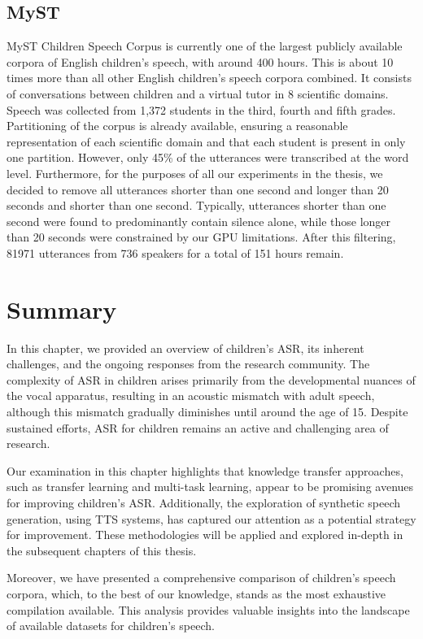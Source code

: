 \subsection{MyST}
\ac{MyST} Children Speech Corpus \cite{MyST} is currently one of the largest publicly available corpora of English children's speech, with around 400 hours. This is about 10 times more than all other English children's speech corpora combined. It consists of conversations between children and a virtual tutor in 8 scientific domains. Speech was collected from 1,372  students in the third, fourth and fifth grades. Partitioning of the corpus is already available, ensuring a reasonable representation of each scientific domain and that each student is present in only one partition. However, only 45\% of the utterances were transcribed at the word level. Furthermore, for the purposes of all our experiments in the thesis, we decided to remove all utterances shorter than one second and longer than 20 seconds and shorter than one second. Typically, utterances shorter than one second were found to predominantly contain silence alone, while those longer than 20 seconds were constrained by our GPU limitations. After this filtering, 81971 utterances from 736 speakers for a total of 151 hours remain.


\section{Summary}
In this chapter, we provided an overview of children's \ac{ASR}, its inherent challenges, and the ongoing responses from the research community. The complexity of \ac{ASR} in children arises primarily from the developmental nuances of the vocal apparatus, resulting in an acoustic mismatch with adult speech, although this mismatch gradually diminishes until around the age of 15. Despite sustained efforts, \ac{ASR} for children remains an active and challenging area of research.

Our examination in this chapter highlights that knowledge transfer approaches, such as transfer learning and multi-task learning, appear to be promising avenues for improving children's \ac{ASR}. Additionally, the exploration of synthetic speech generation, using \ac{TTS} systems, has captured our attention as a potential strategy for improvement. These methodologies will be applied and explored in-depth in the subsequent chapters of this thesis.

Moreover, we have presented a comprehensive comparison of children's speech corpora, which, to the best of our knowledge, stands as the most exhaustive compilation available. This analysis provides valuable insights into the landscape of available datasets for children's speech.
